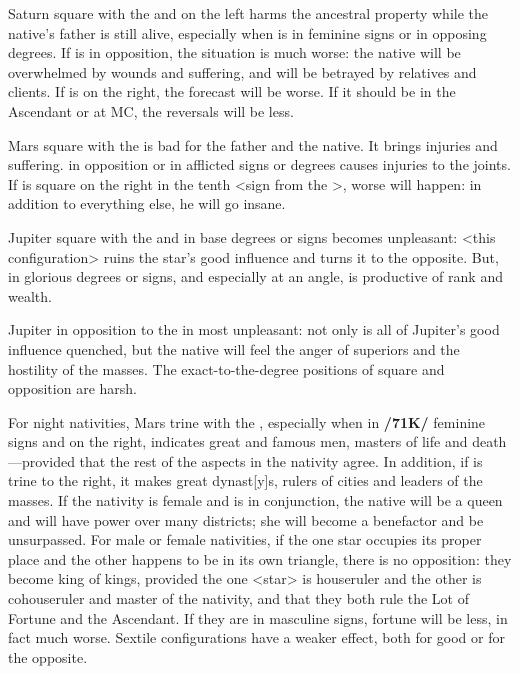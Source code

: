 Saturn \marginnote{\Saturn \Square \Sun} square with the \Sun\xspace and on the left harms the ancestral property while the native’s father is still alive, especially when \Saturn\xspace is in feminine signs or in opposing degrees. If \Saturn\xspace is in opposition, the situation is much worse: the native will be overwhelmed by wounds and suffering, and will be betrayed by relatives and clients. If \Saturn\xspace is on the right, the forecast will be worse. If it should be in the Ascendant or at MC, the reversals will be less.

Mars \marginnote{\Mars \Square \Sun} square with the \Sun\xspace is bad for the father and the native. It brings injuries and suffering. \Mars\xspace in opposition or in afflicted signs or degrees causes injuries to the joints. If \Mars\xspace is square on the right in the tenth <sign from the \Sun>, worse will happen: in addition to everything else, he will go insane.

Jupiter \marginnote{\Jupiter \Square \Sun} square with the \Sun\xspace and in base degrees or signs becomes unpleasant: <this configuration> ruins the star’s good influence and turns it to the opposite. But, \Jupiter\xspace in glorious degrees or signs, and especially at an angle, is productive of rank and wealth. 

Jupiter \marginnote{\Jupiter \Opposition \Sun} in opposition to the \Sun\xspace in most unpleasant: not only is all of Jupiter’s good influence quenched, but the native will feel the anger of superiors and the hostility of the masses. The \mndl exact-to-the-degree positions of square and opposition are
harsh.

For night nativities, Mars \marginnote{\Mars \Trine \Sun} trine with the \Sun, especially when in \textbf{/71K/} feminine signs and on the right, indicates great and famous men, masters of life and death—provided that the rest of the aspects in the nativity agree. In addition, if \Jupiter\xspace is trine to the right, it makes great dynast[y]s, rulers of cities and leaders of the masses. If the nativity is female and \Venus\xspace is in conjunction, the native will be a queen and will have power over many districts; she will become a benefactor and be unsurpassed. For male or female
nativities, if the one star occupies its proper place and the other happens to be in its own triangle, there is
no opposition: they become king of kings, provided the one <star> is houseruler and the other is cohouseruler
and master of the nativity, and that they both rule the Lot of Fortune and the Ascendant. If they are in masculine signs, fortune will be less, in fact much worse. Sextile \mndl configurations have a weaker effect, both for good or for the opposite.

